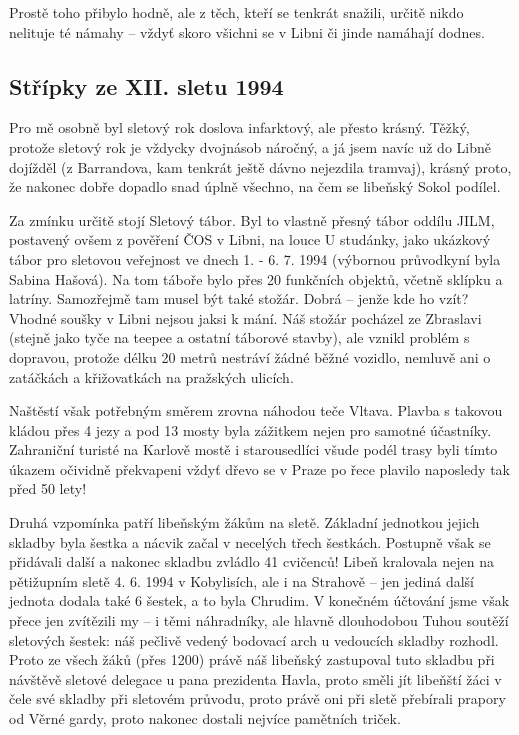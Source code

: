 Prostě toho přibylo hodně, ale z těch, kteří se tenkrát snažili, určitě
nikdo nelituje té námahy -- vždyť skoro všichni se v Libni či jinde
namáhají dodnes.

\subsection{Střípky ze XII. sletu
1994}\label{stux159uxedpky-ze-xii.-sletu-1994}

Pro mě osobně byl sletový rok doslova infarktový, ale přesto krásný.
Těžký, protože sletový rok je vždycky dvojnásob náročný, a já jsem navíc
už do Libně dojížděl (z Barrandova, kam tenkrát ještě dávno nejezdila
tramvaj), krásný proto, že nakonec dobře dopadlo snad úplně všechno, na
čem se libeňský Sokol podílel.

Za zmínku určitě stojí Sletový tábor. Byl to vlastně přesný tábor oddílu
JILM, postavený ovšem z pověření ČOS v Libni, na louce U studánky, jako
ukázkový tábor pro sletovou veřejnost ve dnech 1. - 6. 7. 1994 (výbornou
průvodkyní byla Sabina Hašová). Na tom táboře bylo přes 20 funkčních
objektů, včetně sklípku a latríny. Samozřejmě tam musel být také stožár.
Dobrá -- jenže kde ho vzít? Vhodné soušky v Libni nejsou jaksi k mání.
Náš stožár pocházel ze Zbraslavi (stejně jako tyče na teepee a ostatní
táborové stavby), ale vznikl problém s dopravou, protože délku 20 metrů
nestráví žádné běžné vozidlo, nemluvě ani o zatáčkách a křižovatkách na
pražských ulicích.

Naštěstí však potřebným směrem zrovna náhodou teče Vltava. Plavba s
takovou kládou přes 4 jezy a pod 13 mosty byla zážitkem nejen pro
samotné účastníky. Zahraniční turisté na Karlově mostě i starousedlíci
všude podél trasy byli tímto úkazem očividně překvapeni vždyť dřevo se v
Praze po řece plavilo naposledy tak před 50 lety!

Druhá vzpomínka patří libeňským žákům na sletě. Základní jednotkou
jejich skladby byla šestka a nácvik začal v necelých třech šestkách.
Postupně však se přidávali další a nakonec skladbu zvládlo 41 cvičenců!
Libeň kralovala nejen na pětižupním sletě 4. 6. 1994 v Kobylisích, ale i
na Strahově -- jen jediná další jednota dodala také 6 šestek, a to byla
Chrudim. V konečném účtování jsme však přece jen zvítězili my -- i těmi
náhradníky, ale hlavně dlouhodobou Tuhou soutěží sletových šestek: náš
pečlivě vedený bodovací arch u vedoucích skladby rozhodl. Proto ze všech
žáků (přes 1200) právě náš libeňský zastupoval tuto skladbu při návštěvě
sletové delegace u pana prezidenta Havla, proto směli jít libeňští žáci
v čele své skladby při sletovém průvodu, proto právě oni při sletě
přebírali prapory od Věrné gardy, proto nakonec dostali nejvíce
pamětních triček.

